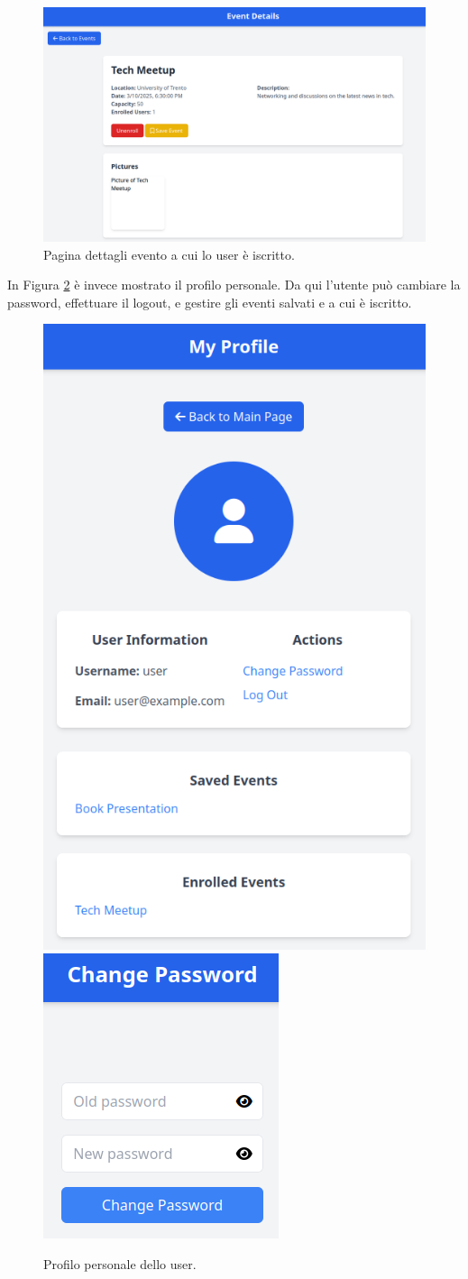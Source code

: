 \documentclass[9pt]{extarticle}
\begin{document}
\newpage

\begin{figure}[!htb]
	\centering
	\includegraphics[width=0.9\linewidth]{./images/EventDetails3.png}
	\caption{Pagina dettagli evento a cui lo user è iscritto.}
	\label{fig:eventDetails3}
\end{figure}

In Figura \ref{fig:profile} è invece mostrato il profilo personale. Da qui l'utente può cambiare la password, effettuare il logout, e gestire gli eventi salvati e a cui è iscritto.

\begin{figure}[!htb]
	\centering
	\includegraphics[width=0.4\linewidth]{./images/Profile.png}
	\hspace{1cm}
	\includegraphics[width=0.25\linewidth]{./images/changePwd.png}
	\caption{Profilo personale dello user.}
	\label{fig:profile}
\end{figure}
\newpage
\end{document}
